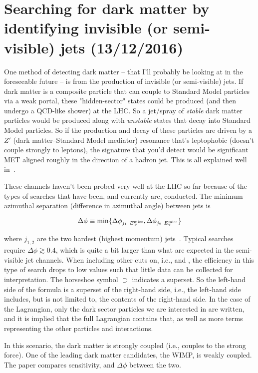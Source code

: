 
\chapter{Searching for dark matter by identifying invisible (or semi-visible) jets (13/12/2016)}
\label{sec:svjoverview}

One method of detecting dark matter -- that I'll probably be looking at in the foreseeable future -- is from the production of invisible (or semi-visible) jets. If dark matter is a composite particle that can couple to Standard Model particles via a weak portal, these "hidden-sector" states could be produced (and then undergo a QCD-like shower) at the LHC. So a jet/spray of \emph{stable} dark matter particles would be produced along with \emph{unstable} states that decay into Standard Model particles. So if the production and decay of these particles are driven by a $Z'$ (dark matter--Standard Model mediator) resonance that's leptophobic (doesn't couple strongly to leptons), the signature that you'd detect would be significant MET aligned roughly in the direction of a hadron jet. This is all explained well in~\cite{Cohen:2015toa}.

These channels haven't been probed very well at the LHC so far because of the types of searches that have been, and currently are, conducted. The minimum azimuthal separation (difference in azimuthal angle) between jets is

\begin{equation}
\Delta\phi \equiv \min \{ \Delta\phi_{j_1 \ E_{\mathrm{T}}^{\text{miss}}}, \Delta\phi_{j_2 \ E_{\mathrm{T}}^{\text{miss}}} \}
\end{equation}

where $j_{1, 2}$ are the two hardest (highest momentum) jets~\cite{Cohen:2015toa}. Typical searches require $\Delta\phi \gtrsim 0.4$, which is quite a bit larger than what are expected in the semi-visible jet channels. When including other cuts on, i.e., \etmiss and \alphat, the efficiency in this type of search drops to low values such that little data can be collected for interpretation. The horseshoe symbol $\supset$ indicates a superset. So the left-hand side of the formula is a superset of the right-hand side, i.e., the left-hand side includes, but is not limited to, the contents of the right-hand side. In the case of the Lagrangian, only the dark sector particles we are interested in are written, and it is implied that the full Lagrangian contains that, as well as more terms representing the other particles and interactions.

In this scenario, the dark matter is strongly coupled (i.e., couples to the strong force). One of the leading dark matter candidates, the WIMP, is weakly coupled. The paper compares sensitivity, \etmiss and $\Delta\phi$ between the two.

